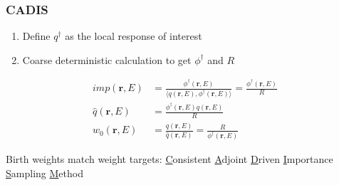 \documentclass[xcolor=x11names,compress, handout]{beamer}
\renewcommand{\(}{\begin{columns}}
\renewcommand{\)}{\end{columns}}
\newcommand{\<}[1]{\begin{column}{#1}}
\renewcommand{\>}{\end{column}}
\newcommand{\ve}[1]{\ensuremath{\mathbf{#1}}}
\begin{document}
\begin{frame}[fragile]
  \frametitle{CADIS \cite{Wagner2007}}
  
  \begin{enumerate}
  \item Define $q^{\dagger}$ as the local response of interest\\
  \item Coarse deterministic calculation to get $\phi^{\dagger}$ and $R$
  \end{enumerate}
% 
\begin{align*}
  imp(\ve{r}, E) &= \frac{\phi^{\dagger}(\ve{r}, E)}{\langle q(\ve{r}, E), \phi^{\dagger}(\ve{r}, E) \rangle} = \frac{\phi^{\dagger}(\ve{r}, E)}{R} \\
  \hat{q}(\ve{r}, E) &= \frac{\phi^{\dagger}(\ve{r}, E) q(\ve{r}, E)}{R} \\
  w_0(\ve{r}, E) &= \frac{q(\ve{r}, E)}{\hat{q}(\ve{r}, E)} = \frac{R}{\phi^{\dagger}(\ve{r}, E)} 
  \label{eq:Importance}
\end{align*}

Birth weights match weight targets: \underline{C}onsistent \underline{A}djoint \underline{D}riven \underline{I}mportance \underline{S}ampling \underline{M}ethod

\end{frame}
\end{document}
